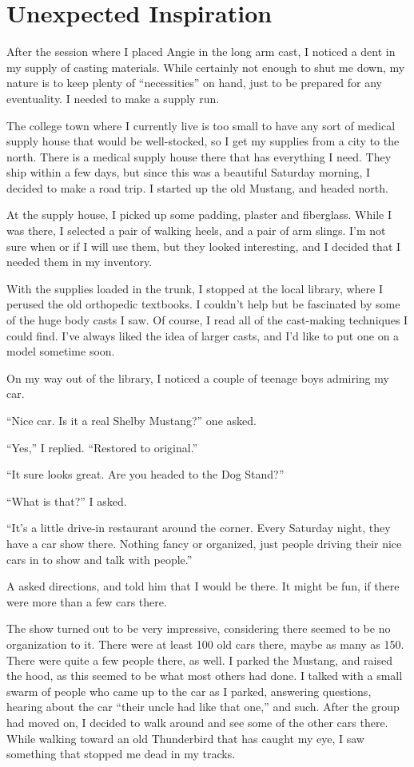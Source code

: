 \chapter{Unexpected Inspiration}
    After the session where I placed Angie in the long arm cast, I noticed a dent in my supply
of casting materials. While certainly not enough to shut me down, my nature is to keep plenty of
``necessities'' on hand, just to be prepared for any eventuality. I needed to make a supply run.

The college town where I currently live is too small to have any sort of medical supply house
that would be well-stocked, so I get my supplies from a city to the north. There is a medical
supply house there that has everything I need. They ship within a few days, but since this was a
beautiful Saturday morning, I decided to make a road trip. I started up the old Mustang, and
headed north.

At the supply house, I picked up some padding, plaster and fiberglass. While I was there, I
selected a pair of walking heels, and a pair of arm slings. I'm not sure when or if I will use
them, but they looked interesting, and I decided that I needed them in my inventory.

With the supplies loaded in the trunk, I stopped at the local library, where I perused the old
orthopedic textbooks. I couldn't help but be fascinated by some of the huge body casts I saw. Of
course, I read all of the cast-making techniques I could find. I've always liked the idea of
larger casts, and I'd like to put one on a model sometime soon.

On my way out of the library, I noticed a couple of teenage boys admiring my car.

``Nice car. Is it a real Shelby Mustang?'' one asked.

``Yes,'' I replied. ``Restored to original.''

``It sure looks great. Are you headed to the Dog Stand?''

``What is that?'' I asked.

``It's a little drive-in restaurant around the corner. Every Saturday night, they have a car
show there. Nothing fancy or organized, just people driving their nice cars in to show and talk
with people.''


A asked directions, and told him that I would be there. It might be fun, if there were more than
a few cars there.


The show turned out to be very impressive, considering there seemed to be no organization to it.
There were at least 100 old cars there, maybe as many as 150. There were quite a few people
there, as well. I parked the Mustang, and raised the hood, as this seemed to be what most others
had done. I talked with a small swarm of people who came up to the car as I parked, answering
questions, hearing about the car ``their uncle had like that one,'' and such. After the group
had moved on, I decided to walk around and see some of the other cars there. While walking
toward an old Thunderbird that has caught my eye, I saw something that stopped me dead in my
tracks.

